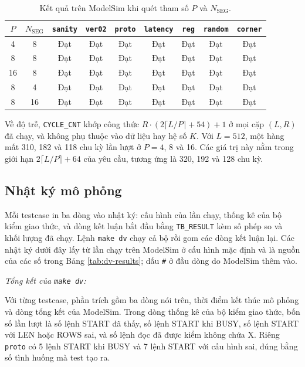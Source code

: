 \begin{table}[htbp]
\centering
\small
\begin{tabular}{ccccccccc}
\toprule
$P$ & $N_{\text{SEG}}$ & \texttt{sanity} & \texttt{ver02} & \texttt{proto} & \texttt{latency} & \texttt{reg} & \texttt{random} & \texttt{corner} \\
\midrule
4  & 8  & Đạt & Đạt & Đạt & Đạt & Đạt & Đạt & Đạt \\
8  & 8  & Đạt & Đạt & Đạt & Đạt & Đạt & Đạt & Đạt \\
16 & 8  & Đạt & Đạt & Đạt & Đạt & Đạt & Đạt & Đạt \\
8  & 4  & Đạt & Đạt & Đạt & Đạt & Đạt & Đạt & Đạt \\
8  & 16 & Đạt & Đạt & Đạt & Đạt & Đạt & Đạt & Đạt \\
\bottomrule
\end{tabular}
\caption{Kết quả trên ModelSim khi quét tham số $P$ và $N_{\text{SEG}}$.}
\label{tab:dv-sweep}
\end{table}

Về độ trễ, \texttt{CYCLE\_CNT} khớp công thức $R \cdot (2\lceil L/P \rceil + 54) + 1$ ở mọi cặp $(L, R)$ đã chạy, và không phụ thuộc vào dữ liệu hay hệ số $K$. Với $L = 512$, một hàng mất 310, 182 và 118 chu kỳ lần lượt ở $P = 4$, 8 và 16. Các giá trị này nằm trong giới hạn $2\lceil L/P \rceil + 64$ của yêu cầu, tương ứng là 320, 192 và 128 chu kỳ.

\subsection{Nhật ký mô phỏng}

Mỗi testcase in ba dòng vào nhật ký: cấu hình của lần chạy, thống kê của bộ kiểm giao thức, và dòng kết luận bắt đầu bằng \texttt{TB\_RESULT} kèm số phép so và khối lượng đã chạy. Lệnh \texttt{make dv} chạy cả bộ rồi gom các dòng kết luận lại. Các nhật ký dưới đây lấy từ lần chạy trên ModelSim ở cấu hình mặc định và là nguồn của các số trong Bảng \ref{tab:dv-results}; dấu \texttt{\#} ở đầu dòng do ModelSim thêm vào.

\noindent\textit{Tổng kết của \texttt{make dv}:}


Với từng testcase, phần trích gồm ba dòng nói trên, thời điểm kết thúc mô phỏng và dòng tổng kết của ModelSim. Trong dòng thống kê của bộ kiểm giao thức, bốn số lần lượt là số lệnh START đã thấy, số lệnh START khi BUSY, số lệnh START với LEN hoặc ROWS sai, và số lệnh đọc đã được kiểm không chứa X. Riêng \texttt{proto} có 5 lệnh START khi BUSY và 7 lệnh START với cấu hình sai, đúng bằng số tình huống mà test tạo ra.

